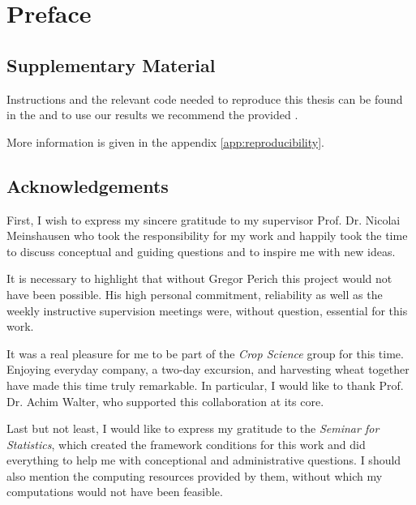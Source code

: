 \chapter*{Preface}

\section*{Supplementary Material}


Instructions and the relevant code needed to reproduce this thesis can be found in the \href{https://github.com/LGraz/MasterThesis-Code}{\color{blue}{GitHub repository}} and to use our results we recommend the provided \href{https://github.com/LGraz/CorrectTimeSeries }{\color{blue}{R-package}}.

More information is given in the appendix \ref{app:reproducibility}.  


\section*{Acknowledgements}
First, I wish to express my sincere gratitude to my supervisor Prof. Dr. Nicolai Meinshausen who took the responsibility for my work and happily took the time to discuss conceptual and guiding questions and to inspire me with new ideas. 

It is necessary to highlight that without Gregor Perich this project would not have been possible. His high personal commitment, reliability as well as the weekly instructive supervision meetings were, without question, essential for this work. 

It was a real pleasure for me to be part of the \textit{Crop Science} group for this time. Enjoying everyday company, a two-day excursion, and harvesting wheat together have made this time truly remarkable. In particular, I would like to thank Prof. Dr. Achim Walter, who supported this collaboration at its core.  

Last but not least, I would like to express my gratitude to the \textit{Seminar for Statistics}, which created the framework conditions for this work and did everything to help me with conceptional and administrative questions. I should also mention the computing resources provided by them, without which my computations would not have been feasible.

